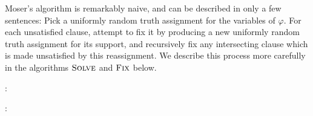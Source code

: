 \documentclass{patmorin}
\begin{document}
Moser's algorithm is remarkably naive, and can be described in only a
few sentences: Pick a uniformly random truth assignment for the
variables of $\varphi$. For each unsatisfied clause, attempt to fix it
by producing a new uniformly random truth assignment for its support,
and recursively fix any intersecting clause which is made unsatisfied
by this reassignment. We describe this process more carefully in the
algorithms $\textsc{Solve}$ and $\textsc{Fix}$ below.

:
\begin{algorithmic}[1]
  \ENDWHILE
  \RETURN{$\alpha$}
\end{algorithmic}

:
\begin{algorithmic}[1]
  \ENDWHILE
  \RETURN{$\alpha$}
\end{algorithmic}
\end{document}
